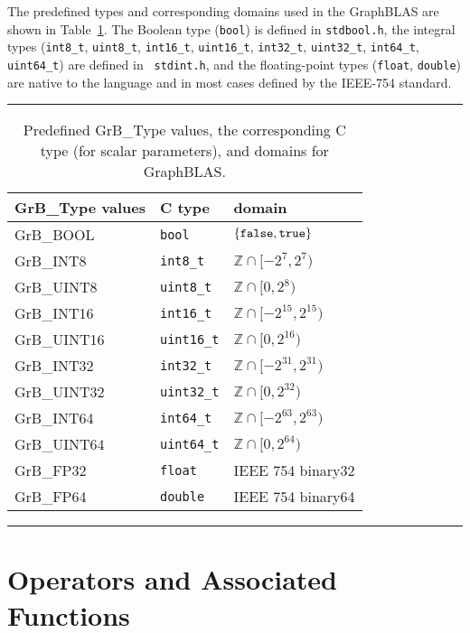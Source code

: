 The predefined types and corresponding domains used in the GraphBLAS are
shown in Table~\ref{Tab:PredefinedTypes}.  The Boolean type ({\tt bool})
is defined in {\tt stdbool.h}, the integral types ({\tt int8\_t},
{\tt uint8\_t}, {\tt int16\_t}, {\tt uint16\_t}, {\tt int32\_t},
{\tt uint32\_t}, {\tt int64\_t}, {\tt uint64\_t}) are defined in {\tt
stdint.h}, and the floating-point types ({\tt float}, {\tt double}) are
native to the language and in most cases defined by the IEEE-754 standard.

\begin{table}
\hrule
\begin{center}
\caption{Predefined {\sf GrB\_Type} values, the corresponding C type (for scalar
parameters), and domains for GraphBLAS.}
\label{Tab:PredefinedTypes}
\begin{tabular}{l|l|l}
{\sf GrB\_Type values} & C type            & domain \\
\hline
{\sf GrB\_BOOL}        & {\tt bool}        & $\{ {\tt false}, {\tt true} \}$  \\
{\sf GrB\_INT8}        & {\tt int8\_t}     & $\mathbb{Z} \cap [-2^{7},2^{7})$  \\
{\sf GrB\_UINT8}       & {\tt uint8\_t}    & $\mathbb{Z} \cap [0,2{^8})$  \\
{\sf GrB\_INT16}       & {\tt int16\_t}    & $\mathbb{Z} \cap [-2^{15},2^{15})$ \\
{\sf GrB\_UINT16}      & {\tt uint16\_t}   & $\mathbb{Z} \cap [0,2^{16})$ \\
{\sf GrB\_INT32}       & {\tt int32\_t}    & $\mathbb{Z} \cap [-2^{31},2^{31})$ \\
{\sf GrB\_UINT32}      & {\tt uint32\_t}   & $\mathbb{Z} \cap [0,2^{32})$ \\
{\sf GrB\_INT64}       & {\tt int64\_t}    & $\mathbb{Z} \cap [-2^{63},2^{63})$ \\
{\sf GrB\_UINT64}      & {\tt uint64\_t}   & $\mathbb{Z} \cap [0,2^{64})$ \\
{\sf GrB\_FP32}        & {\tt float}       & IEEE 754 {\sf binary32}  \\
{\sf GrB\_FP64}        & {\tt double}      & IEEE 754 {\sf binary64}  \\
\end{tabular}
\end{center}
\hrule
\end{table}

\section{Operators and Associated Functions}

